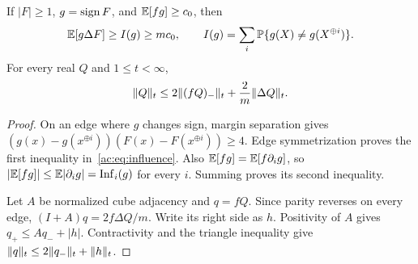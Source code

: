 \begin{lemma}\label{ac:lem:parity}
If $|F|\ge1$, $g=\operatorname{sign} F$, and $\mathbb E[fg]\ge c_0$, then
\begin{equation}\label{ac:eq:influence}
 \mathbb E[g\Delta F]\ge I(g)\ge mc_0,
 \qquad I(g)=\sum_i\mathbb P\{g(X)\ne g(X^{\oplus i})\}.
\end{equation}
For every real $Q$ and $1\le t<\infty$,
\begin{equation}\label{ac:eq:positive}
 \lVert Q\rVert_{t}\le 2\lVert (fQ)_-\rVert_{t}+\frac2m\lVert \Delta Q\rVert_{t}.
\end{equation}
\end{lemma}
\begin{proof}
On an edge where $g$ changes sign, margin separation gives
$(g(x)-g(x^{\oplus i}))(F(x)-F(x^{\oplus i}))\ge4$.
Edge symmetrization proves the first inequality in~\eqref{ac:eq:influence}.
Also $\mathbb E[fg]=\mathbb E[f\partial_i g]$, so
$|\mathbb E[fg]|\le\mathbb E|\partial_i g|=\operatorname{Inf}_i(g)$ for every $i$.
Summing proves its second inequality.

Let $A$ be normalized cube adjacency and $q=fQ$. Since parity reverses on every edge,
$(I+A)q=2f\Delta Q/m$. Write its right side as $h$. Positivity of $A$ gives
$q_+\le A q_-+|h|$. Contractivity and the triangle inequality give
$\lVert q\rVert_{t}\le2\lVert q_-\rVert_{t}+\lVert h\rVert_{t}$.
\end{proof}

